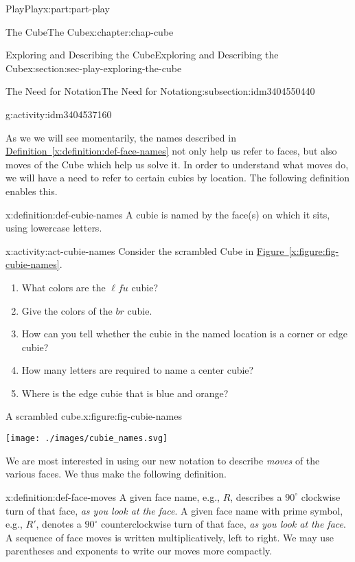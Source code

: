 \documentclass[oneside,10pt,]{book}
\newcommand{\xreffont}{\relax}
\numberwithin{equation}{section}
\begin{document}
\begin{partptx}{Play}{}{Play}{}{}{x:part:part-play}
\begin{chapterptx}{The Cube}{}{The Cube}{}{}{x:chapter:chap-cube}
\begin{sectionptx}{Exploring and Describing the Cube}{}{Exploring and Describing the Cube}{}{}{x:section:sec-play-exploring-the-cube}
\begin{subsectionptx}{The Need for Notation}{}{The Need for Notation}{}{}{g:subsection:idm3404550440}
\begin{activity}{}{g:activity:idm3404537160}
\end{activity}%
As we we will see momentarily, the names described in \hyperref[x:definition:def-face-names]{Definition~{\xreffont\ref{x:definition:def-face-names}}} not only help us refer to faces, but also moves of the Cube which help us solve it. In order to understand what moves do, we will have a need to refer to certain cubies by location. The following definition enables this.%
\begin{definition}{}{x:definition:def-cubie-names}%
A cubie is named by the face(s) on which it sits, using lowercase letters.%
\end{definition}
\begin{activity}{}{x:activity:act-cubie-names}%
Consider the scrambled Cube in \hyperref[x:figure:fig-cubie-names]{Figure~{\xreffont\ref{x:figure:fig-cubie-names}}}.%
%
\begin{enumerate}
\item{}What colors are the \(\ell f u\) cubie?%
\item{}Give the colors of the \(br\) cubie.%
\item{}How can you tell whether the cubie in the named location is a corner or edge cubie?%
\item{}How many letters are required to name a center cubie?%
\item{}Where is the edge cubie that is blue and orange?%
\end{enumerate}
\begin{figureptx}{A scrambled cube.}{x:figure:fig-cubie-names}{}%
\begin{image}{0.25}{0.5}{0.25}%
\texttt{[image: ./images/cubie\_names.svg]}
\end{image}%
\tcblower
\end{figureptx}%
\end{activity}%
We are most interested in using our new notation to describe \emph{moves} of the various faces. We thus make the following definition.%
\begin{definition}{}{x:definition:def-face-moves}%
%
A given face name, e.g., \(R\), describes a \(90^\circ\) clockwise turn of that face, \emph{as you look at the face}. A given face name with prime symbol, e.g., \(R'\), denotes a \(90^\circ\) counterclockwise turn of that face, \emph{as you look at the face}. A sequence of face moves is written multiplicatively, left to right. We may use parentheses and exponents to write our moves more compactly.%
\end{definition}

\end{subsectionptx}
\end{sectionptx}
\end{chapterptx}
\end{partptx}
\end{document}
